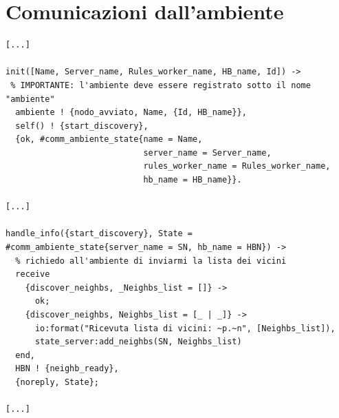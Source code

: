\documentclass[italian]{memoir}
\begin{document}
\chapter{Comunicazioni dall'ambiente}\label{code:commambiente}
\begin{verbatim}
[...]

init([Name, Server_name, Rules_worker_name, HB_name, Id]) ->
 % IMPORTANTE: l'ambiente deve essere registrato sotto il nome "ambiente"
  ambiente ! {nodo_avviato, Name, {Id, HB_name}},
  self() ! {start_discovery},
  {ok, #comm_ambiente_state{name = Name,
                            server_name = Server_name,
                            rules_worker_name = Rules_worker_name, 
                            hb_name = HB_name}}.

[...]

handle_info({start_discovery}, State = #comm_ambiente_state{server_name = SN, hb_name = HBN}) ->
  % richiedo all'ambiente di inviarmi la lista dei vicini
  receive
    {discover_neighbs, _Neighbs_list = []} ->
      ok;
    {discover_neighbs, Neighbs_list = [_ | _]} ->
      io:format("Ricevuta lista di vicini: ~p.~n", [Neighbs_list]),
      state_server:add_neighbs(SN, Neighbs_list)
  end,
  HBN ! {neighb_ready},
  {noreply, State};

[...]
\end{verbatim}
\end{document}
